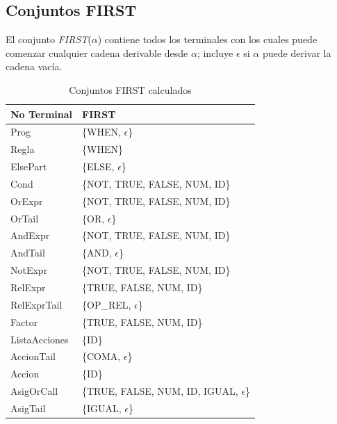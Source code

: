 \documentclass[12pt,a4paper]{article}
\begin{document}
\subsection{Conjuntos FIRST}
El conjunto \textit{FIRST}($\alpha$) contiene todos los terminales con los cuales puede comenzar cualquier cadena derivable desde $\alpha$; incluye $\epsilon$ si $\alpha$ puede derivar la cadena vacía.

\begin{table}[H]
\centering
\begin{tabular}{|l|l|}
\hline
\textbf{No Terminal} & \textbf{FIRST}\\ \hline
Prog & \{WHEN, $\epsilon$\}\\ \hline
Regla & \{WHEN\}\\ \hline
ElsePart & \{ELSE, $\epsilon$\}\\ \hline
Cond & \{NOT, TRUE, FALSE, NUM, ID\}\\ \hline
OrExpr & \{NOT, TRUE, FALSE, NUM, ID\}\\ \hline
OrTail & \{OR, $\epsilon$\}\\ \hline
AndExpr & \{NOT, TRUE, FALSE, NUM, ID\}\\ \hline
AndTail & \{AND, $\epsilon$\}\\ \hline
NotExpr & \{NOT, TRUE, FALSE, NUM, ID\}\\ \hline
RelExpr & \{TRUE, FALSE, NUM, ID\}\\ \hline
RelExprTail & \{OP\_REL, $\epsilon$\}\\ \hline
Factor & \{TRUE, FALSE, NUM, ID\}\\ \hline
ListaAcciones & \{ID\}\\ \hline
AccionTail & \{COMA, $\epsilon$\}\\ \hline
Accion & \{ID\}\\ \hline
AsigOrCall & \{TRUE, FALSE, NUM, ID, IGUAL, $\epsilon$\}\\ \hline
AsigTail & \{IGUAL, $\epsilon$\}\\ \hline
\end{tabular}
\caption{Conjuntos FIRST calculados}
\label{tab:first}
\end{table}
\end{document}
